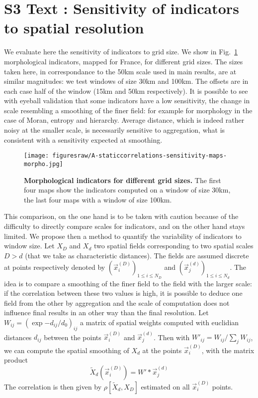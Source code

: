 



\section*{S3 Text : Sensitivity of indicators to spatial resolution}

We evaluate here the sensitivity of indicators to grid size. We show in Fig.~\ref{fig:app:staticcorrelations:sensitivity-maps-morpho} morphological indicators, mapped for France, for different grid sizes. The sizes taken here, in correspondance to the 50km scale used in main results, are at similar magnitudes: we test windows of size 30km and 100km. The offsets are in each case half of the window (15km and 50km respectively). It is possible to see with eyeball validation that some indicators have a low sensitivity, the change in scale resembling a smoothing of the finer field: for example for morphology in the case of Moran, entropy and hierarchy. Average distance, which is indeed rather noisy at the smaller scale, is necessarily sensitive to aggregation, what is consistent with a sensitivity expected at smoothing. 


\begin{figure}
	\texttt{[image: figuresraw/A-staticcorrelations-sensitivity-maps-morpho.jpg]}
	\caption{\textbf{Morphological indicators for different grid sizes.} The first four maps show the indicators computed on a window of size 30km, the last four maps with a window of size 100km.\label{fig:app:staticcorrelations:sensitivity-maps-morpho}}
\end{figure}


This comparison, on the one hand is to be taken with caution because of the difficulty to directly compare scales for indicators, and on the other hand stays limited. We propose then a method to quantify the variability of indicators to window size. Let $X_D$ and $X_d$ two spatial fields corresponding to two spatial scales $D > d$ (that we take as characteristic distances). The fields are assumed discrete at points respectively denoted by $\left(\vec{x}_i^{(D)}\right)_{1 \leq i \leq N_D}$ and $\left(\vec{x}_j^{(d)}\right)_{1 \leq i \leq N_d}$. The idea is to compare a smoothing of the finer field to the field with the larger scale: if the correlation between these two values is high, it is possible to deduce one field from the other by aggregation and the scale of computation does not influence final results in an other way than the final resolution. Let $W_{ij} = \left( \exp{ - d_{ij} / d_0} \right)_{ij}$ a matrix of spatial weights computed with euclidian distances $d_{ij}$ between the points $\vec{x}_i^{(D)}$ and $\vec{x}_j^{(d)}$. Then with $W'_{ij} = W_{ij} / \sum_j W_{ij}$, we can compute the spatial smoothing of $X_d$ at the points $\vec{x}_i^{(D)}$, with the matrix product
\[
\tilde{X}_d (\vec{x}_i^{(D)}) = W' \ast \vec{x}_j^{(d)}
\]
The correlation is then given by $\rho\left[\tilde{X}_d,X_D\right]$ estimated on all $\vec{x}_i^{(D)}$ points.




